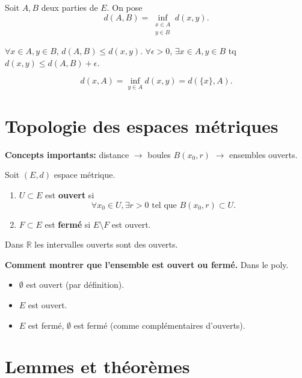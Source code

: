 \documentclass[oneside]{book}
\begin{document}
\begin{definition}
Soit $A, B$ deux parties de $E$. On pose
\[
d(A, B) = \inf_{\substack{x \in A \\ y \in B}} d(x, y).
\]
\end{definition}

\begin{remark}
$\forall x \in A, y \in B$, $d(A, B) \leq d(x, y)$.
$\forall \epsilon > 0$, $\exists x \in A, y \in B$ tq $d(x, y) \leq d(A, B) + \epsilon$.
\end{remark}

\begin{proposition}
\[
d(x, A) = \inf_{y \in A} d(x, y) = d(\{x\}, A).
\]
\end{proposition}

\section{Topologie des espaces métriques}

\textbf{Concepts importants:} distance $\to$ boules $B(x_0, r)$ $\to$ ensembles ouverts.

\begin{definition}
Soit $(E, d)$ espace métrique.
\begin{enumerate}
    \item $U \subset E$ est \textbf{ouvert} si
    \[
    \forall x_0 \in U, \exists r > 0 \text{ tel que } B(x_0, r) \subset U.
    \]
    \item $F \subset E$ est \textbf{fermé} si $E \setminus F$ est ouvert.
\end{enumerate}
\end{definition}

\begin{remark}
Dans $\mathbb{R}$ les intervalles ouverts sont des ouverts.
\end{remark}

\textbf{Comment montrer que l'ensemble est ouvert ou fermé.} Dans le poly.

\begin{itemize}
    \item $\emptyset$ est ouvert (par définition).
    \item $E$ est ouvert.
    \item $E$ est fermé, $\emptyset$ est fermé (comme complémentaires d'ouverts).
\end{itemize}

\section{Lemmes et théorèmes}
\end{document}
